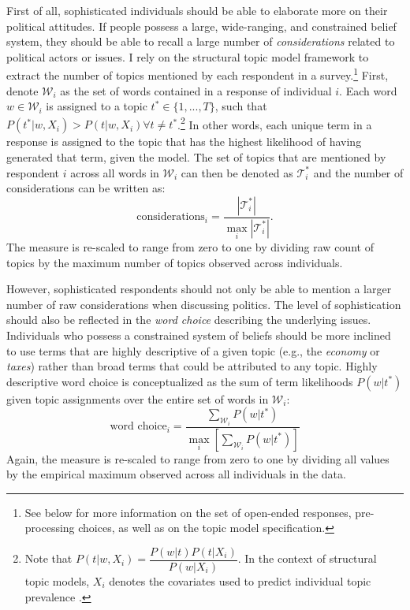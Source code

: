 First of all, sophisticated individuals should be able to elaborate more on their political attitudes. If people possess a large, wide-ranging, and constrained belief system, they should be able to recall a large number of \textit{considerations} related to political actors or issues. I rely on the structural topic model framework \citep{roberts2014structural} to extract the number of topics mentioned by each respondent in a survey.\footnote{See below for more information on the set of open-ended responses, pre-processing choices, as well as on the topic model specification.} First, denote $\mathcal{W}_i$ as the set of words contained in a response of individual $i$. Each word $w\in\mathcal{W}_i$ is assigned to a topic $t^* \in \{1,...,T\} $, such that $P(t^*|w,X_i) > P(t|w,X_i) \forall t\neq t^*$.\footnote{Note that $P(t|w,X_i)=\dfrac{P(w|t)P(t|X_i)}{P(w|X_i)}$. In the context of structural topic models, $X_i$ denotes the covariates used to predict individual topic prevalence \citep[see][for details]{roberts2014structural}.} In other words, each unique term in a response is assigned to the topic that has the highest likelihood of having generated that term, given the model. The set of topics that are mentioned by respondent $i$ across all words in $\mathcal{W}_i$ can then be denoted as $\mathcal{T}^*_i$ and the number of considerations can be written as:
\begin{equation}
\text{considerations}_i = \dfrac{|\mathcal{T}^*_i|}{\max_i|\mathcal{T}^*_i|}.
\end{equation}
The measure is re-scaled to range from zero to one by dividing raw count of topics by the maximum number of topics observed across individuals.

However, sophisticated respondents should not only be able to mention a larger number of raw considerations when discussing politics. The level of sophistication should also be reflected in the \textit{word choice} describing the underlying issues. Individuals who possess a constrained system of beliefs should be more inclined to use terms that are highly descriptive of a given topic (e.g., the \textit{economy} or \textit{taxes}) rather than broad terms that could be attributed to any topic. Highly descriptive word choice is conceptualized as the sum of term likelihoods $P(w|t^*)$ given topic assignments over the entire set of words in $\mathcal{W}_i$:
\begin{equation}
\text{word choice}_i = \dfrac{\sum_{\mathcal{W}_i} P(w|t^*)}{\max_i\left[\sum_{\mathcal{W}_i} P(w|t^*)\right]}
\end{equation}
Again, the measure is re-scaled to range from zero to one by dividing all values by the empirical maximum observed across all individuals in the data.

